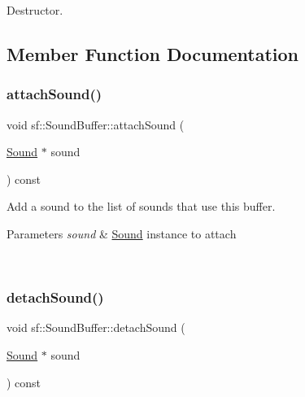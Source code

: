 Destructor. 

\begin{DoxyVerb}\end{DoxyVerb}
 

\subsection{Member Function Documentation}
\mbox{\label{classsf_1_1_sound_buffer_a2761144856e452446cc26fda484b2b16}} 
\subsubsection{\texorpdfstring{attachSound()}{attachSound()}}
{\footnotesize\ttfamily void sf\+::\+Sound\+Buffer\+::attach\+Sound (\begin{DoxyParamCaption}\item[{\mbox{\hyperlink{classsf_1_1_sound}{Sound}} $\ast$}]{sound }\end{DoxyParamCaption}) const\hspace{0.3cm}{\ttfamily [private]}}



Add a sound to the list of sounds that use this buffer. 


\begin{DoxyParams}{Parameters}
{\em sound} & \mbox{\hyperlink{classsf_1_1_sound}{Sound}} instance to attach \begin{DoxyVerb}\end{DoxyVerb}
 \\
\hline
\end{DoxyParams}
\mbox{\label{classsf_1_1_sound_buffer_a02732b7adfaad67c931e2494a14a7027}} 
\subsubsection{\texorpdfstring{detachSound()}{detachSound()}}
{\footnotesize\ttfamily void sf\+::\+Sound\+Buffer\+::detach\+Sound (\begin{DoxyParamCaption}\item[{\mbox{\hyperlink{classsf_1_1_sound}{Sound}} $\ast$}]{sound }\end{DoxyParamCaption}) const\hspace{0.3cm}{\ttfamily [private]}}



